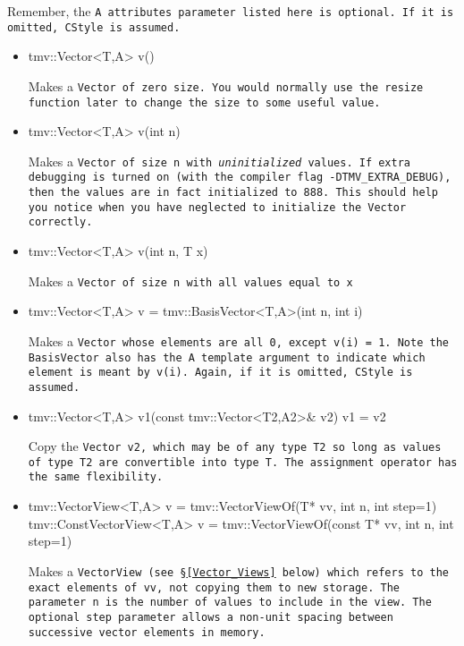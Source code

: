 Remember, the \tt{A} attributes parameter listed here is optional.  If it is omitted, \tt{CStyle} is assumed.

\begin{itemize}

\item 
\begin{tmvcode}
tmv::Vector<T,A> v()
\end{tmvcode}
Makes a \tt{Vector} of zero size.  You would normally use the \tt{resize} function later to 
change the size to some useful value.

\item 
\begin{tmvcode}
tmv::Vector<T,A> v(int n)
\end{tmvcode}
Makes a \tt{Vector} of size \tt{n} with {\em uninitialized} values.
If extra debugging is turned on (with the compiler flag \tt{-DTMV\_EXTRA\_DEBUG}), then the values are in fact initialized to 888.  This should help you notice when you have neglected to initialize the \tt{Vector} correctly.

\item
\begin{tmvcode}
tmv::Vector<T,A> v(int n, T x)
\end{tmvcode}
Makes a \tt{Vector} of size \tt{n} with all values equal to \tt{x}

\item
\begin{tmvcode}
tmv::Vector<T,A> v = tmv::BasisVector<T,A>(int n, int i)
\end{tmvcode}
Makes a \tt{Vector} whose elements are all \tt{0}, except \tt{v(i) = 1}.
Note the \tt{BasisVector} also has the \tt{A} template argument to 
indicate which element is meant by \tt{v(i)}.  Again, if it is omitted,
\tt{CStyle} is assumed.

\item
\begin{tmvcode}
tmv::Vector<T,A> v1(const tmv::Vector<T2,A2>& v2)
v1 = v2
\end{tmvcode}
Copy the \tt{Vector v2}, which may be of any type \tt{T2} so long
as values of type \tt{T2} are convertible into type \tt{T}.
The assignment operator has the same flexibility.

\item
\begin{tmvcode}
tmv::VectorView<T,A> v = 
      tmv::VectorViewOf(T* vv, int n, int step=1)
tmv::ConstVectorView<T,A> v = 
      tmv::VectorViewOf(const T* vv, int n, int step=1)
\end{tmvcode}
Makes a \tt{VectorView} (see \S\ref{Vector_Views} below) which refers to the exact
elements of \tt{vv}, not copying them to new storage.  The parameter \tt{n}
is the number of values to include in the view.
The optional \tt{step} parameter allows a non-unit spacing between 
successive vector elements in memory. 

\end{itemize}


